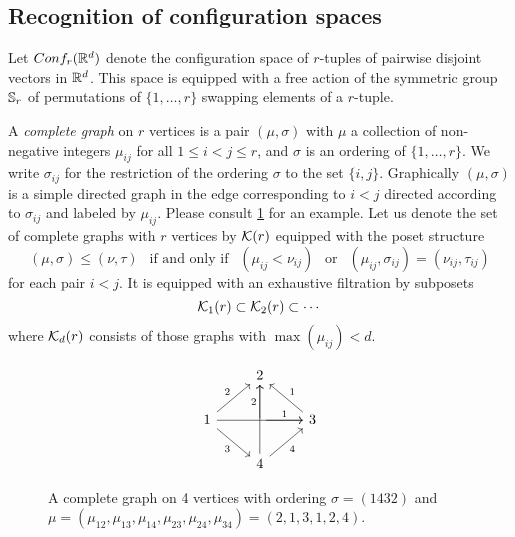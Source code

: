 
\subsection{Recognition of configuration spaces}\label{ss:recognition}

Let $Conf_{r}(\mathbb{R}^{d})$ denote the configuration space of $r$-tuples of pairwise disjoint vectors in $\mathbb{R}^{d}$.
This space is equipped with a free action of the symmetric group $\mathbb{S}_r$ of permutations of $\{1,\dots,r\}$ swapping elements of a $r$-tuple.

\begin{definition}
	A \textit{complete graph} on $r$ vertices is a pair $(\mu,\sigma)$ with $\mu$ a collection of non-negative integers $\mu_{ij}$ for all $1 \leq i < j \leq r$, and $\sigma$ is an ordering of $\{1,\dots,r\}$.
	We write $\sigma_{ij}$ for the restriction of the ordering $\sigma$ to the set $\{i,j\}$.
	Graphically $(\mu,\sigma)$ is a simple directed graph in the edge corresponding to $i<j$ directed according to $\sigma_{ij}$ and labeled by $\mu_{ij}$.
	Please consult \cref{f:complete graph} for an example.
	Let us denote the set of complete graphs with $r$ vertices by $\mathcal{K}(r)$ equipped with the poset structure
	\begin{equation*}
		(\mu,\sigma)\le (\nu,\tau) \ \ \text{ if and only if } \ \
		(\mu_{ij}<\nu_{ij}) \ \ \text{ or } \ \
		(\mu_{ij},\sigma_{ij})= (\nu_{ij},\tau_{ij})
	\end{equation*}
	for each pair $i<j$.
	It is equipped with an exhaustive filtration by subposets
	\[
	\mathcal{K}_1(r) \subset \mathcal{K}_2(r) \subset \dotsb
	\]
	where $\mathcal{K}_d(r)$ consists of those graphs with $\max(\mu_{ij}) < d$.
\end{definition}

\begin{figure}
	\centering
	\begin{equation*}
		\begin{tikzcd}
			\ & 2 & \ \\
			1 \arrow[ur,"2"] \arrow[rr] \arrow[dr,"3"']& \arrow[r,"1"] \arrow[u,"2"] & 3 \arrow[ul,"1"'] \\
			\ & 4 \arrow[ur,"4"'] \arrow[uu] & \
		\end{tikzcd}
	\end{equation*}
	\caption{A complete graph on 4 vertices with ordering $\sigma=(1432)$ and $\mu=(\mu_{12},\mu_{13},\mu_{14},\mu_{23},\mu_{24},\mu_{34})=(2,1,3,1,2,4)$.}
	\label{f:complete graph}
\end{figure}

